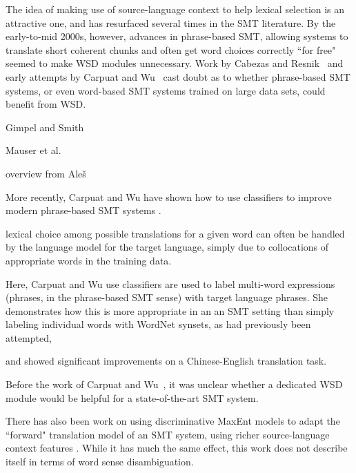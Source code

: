 The idea of making use of source-language context to help lexical selection is
an attractive one, and has resurfaced several times in the SMT literature. By
the early-to-mid 2000s, however, advances in phrase-based SMT, allowing systems
to translate short coherent chunks and often get word choices correctly ``for
free" seemed to make WSD modules unnecessary. Work by Cabezas and
Resnik~\cite{cabezas2005using} and early attempts by Carpuat and
Wu~\cite{carpuat-wu:2005:ACL} cast doubt as to whether phrase-based SMT
systems, or even word-based SMT systems trained on large data sets, could
benefit from WSD.


Gimpel and Smith \cite{gimpel-smith:2008:WMT}


Mauser et al. \cite{mauser-hasan-ney:2009:EMNLP}


overview from Ale\v{s} \cite{tamchyna2013utilizing}


More recently, Carpuat and Wu have shown how to use classifiers to improve
modern phrase-based SMT systems
\cite{carpuatpsd,carpuat-wu:2007:EMNLP-CoNLL2007,carpuat2008evaluation}.


lexical choice among possible translations for a given word can
often be handled by the language model for the target language, simply due to
collocations of appropriate words in the training data.

Here, Carpuat and Wu use classifiers are used to label multi-word expressions
(phrases, in the phrase-based SMT sense) with target language phrases.
She demonstrates
how this is more appropriate in an an SMT setting than simply labeling
individual words with WordNet synsets, as had previously been attempted,

and showed significant improvements on a Chinese-English translation task.

Before the work of Carpuat and Wu~\cite{improvingsmtwsd}, it was
unclear whether a dedicated WSD module would be helpful for a state-of-the-art 
SMT system.



There has also been work on using discriminative MaxEnt models to adapt
the ``forward" translation model of an SMT system, using richer
source-language context features \cite{vzabokrtsky-popel-marevcek:2010:WMT}.
While it has much the same effect, this work does not describe itself in terms
of word sense disambiguation.

